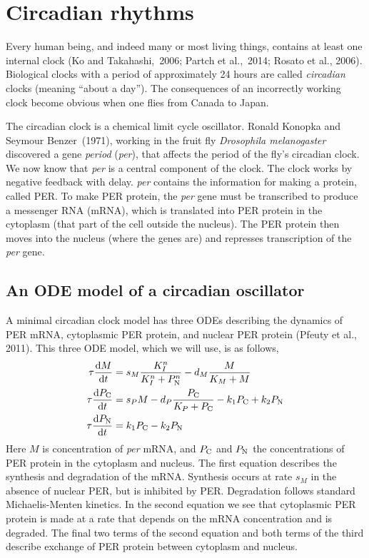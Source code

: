 

\section{Circadian rhythms}
Every human being, and indeed many or most living things, contains at
least one internal clock (Ko and Takahashi,~2006; Partch et al.,~2014;
Rosato et al., 2006). Biological clocks with a period of 
approximately 24 hours are called \textit{circadian} clocks (meaning
“about a day”). The consequences of an incorrectly working clock
become obvious when one flies from Canada to Japan.

The circadian clock is a chemical limit cycle oscillator. Ronald
Konopka and Seymour Benzer~(1971), working in the fruit fly
\textit{Drosophila melanogaster} discovered a gene \textit{period}
(\textit{per}), that affects the period of the fly's circadian clock.
We now know that \textit{per} is a central component of the clock.
The clock works by negative feedback with delay. \textit{per}
contains the information for making a protein, called PER. To make
PER protein, the \textit{per} gene must be transcribed to produce a
messenger RNA (mRNA), which is translated into PER protein in the
cytoplasm (that part of the cell outside the nucleus). The PER
protein then moves into the nucleus (where the genes are) and
represses transcription of the \textit{per} gene. 

\subsection{An ODE model of a circadian oscillator}
A minimal circadian clock model has three ODEs describing the dynamics
of PER mRNA, cytoplasmic PER protein, and nuclear PER protein (Pfeuty
et al., 2011). This three ODE model, which we will use, is as
follows,
\begin{equation}\label{eq:Pfeutysystem}
\begin{aligned}
\tau\dv{M}{t}&={s}_{M}\frac{{K}_{I}^{n}}{{K}_{I}^{n}+P_{\text{N}}^{n}}-{d}_{M}\frac{M}{{K}_{M}+M}\\
\tau\dv{P_{\text{C}}}{t}&={s}_{P}M-{d}_{P}\frac{P_{\text{C}}}{{K}_{P}+P_{\text{C}}}-{k}_{1}P_{\text{C}}+{k}_{2}P_{\text{N}}\\
\tau \dv{P_{\text{N}}}{t}&={k}_{1}P_{\text{C}}-{k}_{2}P_{\text{N}}
\end{aligned}
\end{equation}
Here  $M$ is concentration of \textit{per} mRNA, and  $P_{\text{C}}$ and 
$P_{\text{N}}$ the concentrations of PER protein in the cytoplasm and
nucleus. The first equation describes the synthesis and degradation
of the mRNA. Synthesis occurs at rate  ${s}_{M}$ in the absence of
nuclear PER, but is inhibited by PER. Degradation follows standard
Michaelis-Menten kinetics. In the second equation we see that
cytoplasmic PER protein is made at a rate that depends on the mRNA
concentration and is degraded. The final two terms of the second
equation and both terms of the third describe exchange of PER protein
between cytoplasm and nucleus. 

